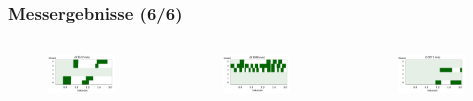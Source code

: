 \documentclass{beamer}
\begin{document}
\begin{frame}
	\frametitle{Messergebnisse (6/6)}
	\begin{columns}
		\begin{figure}
			\includegraphics[width=0.9\textwidth]{img/hum33.png} 
		\end{figure}
		\begin{figure}
			\includegraphics[width=0.9\textwidth]{img/hum35.png}
		\end{figure}
		\begin{figure}
			\includegraphics[width=0.9\textwidth]{img/hum34.png} 

\end{figure}
\end{columns}
\end{frame}
\end{document}
